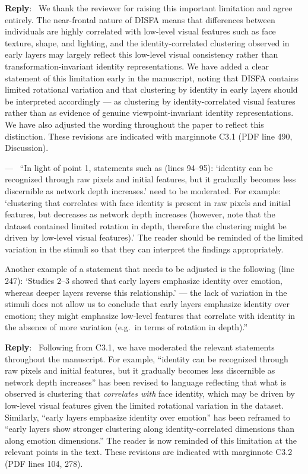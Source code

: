 \documentclass[11pt]{article}
\newcounter{reviewer}
\newcounter{point}[reviewer]
\renewcommand{\thepoint}{Comment\,\thereviewer.\arabic{point}}
\newenvironment{point}
   {\refstepcounter{point} \bigskip \noindent {\textbf{\thepoint} } ---\ }
   {\par }
\newenvironment{reply}
   {\medskip \noindent \color{blue} \begin{sf}\textbf{Reply}:\  }
   {\medskip \par \end{sf}}
\begin{document}
\begin{reply}
We thank the reviewer for raising this important limitation and agree entirely. The near-frontal nature of DISFA means that differences between individuals are highly correlated with low-level visual features such as face texture, shape, and lighting, and the identity-correlated clustering observed in early layers may largely reflect this low-level visual consistency rather than transformation-invariant identity representations. We have added a clear statement of this limitation early in the manuscript, noting that DISFA contains limited rotational variation and that clustering by identity in early layers should be interpreted accordingly --- as clustering by identity-correlated visual features rather than as evidence of genuine viewpoint-invariant identity representations. We have also adjusted the wording throughout the paper to reflect this distinction. These revisions are indicated with marginnote C3.1 (PDF line 490, Discussion).
\end{reply}

\begin{point}
``In light of point 1, statements such as (lines 94--95): `identity can be recognized through raw pixels and initial features, but it gradually becomes less discernible as network depth increases.' need to be moderated. For example: `clustering that correlates with face identity is present in raw pixels and initial features, but decreases as network depth increases (however, note that the dataset contained limited rotation in depth, therefore the clustering might be driven by low-level visual features).' The reader should be reminded of the limited variation in the stimuli so that they can interpret the findings appropriately.

Another example of a statement that needs to be adjusted is the following (line 247): `Studies 2--3 showed that early layers emphasize identity over emotion, whereas deeper layers reverse this relationship.' --- the lack of variation in the stimuli does not allow us to conclude that early layers emphasize identity over emotion; they might emphasize low-level features that correlate with identity in the absence of more variation (e.g.\ in terms of rotation in depth).''
\label{comment_2_2}
\end{point}

\begin{reply}
Following from C3.1, we have moderated the relevant statements throughout the manuscript. For example, ``identity can be recognized through raw pixels and initial features, but it gradually becomes less discernible as network depth increases'' has been revised to language reflecting that what is observed is clustering that \emph{correlates with} face identity, which may be driven by low-level visual features given the limited rotational variation in the dataset. Similarly, ``early layers emphasize identity over emotion'' has been reframed to ``early layers show stronger clustering along identity-correlated dimensions than along emotion dimensions.'' The reader is now reminded of this limitation at the relevant points in the text. These revisions are indicated with marginnote C3.2 (PDF lines 104, 278).
\end{reply}
\end{document}
